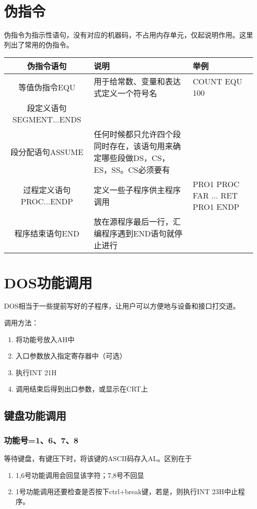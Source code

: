 \section{伪指令}
伪指令为指示性语句，没有对应的机器码，不占用内存单元，仅起说明作用。这里列出了常用的伪指令。
\begin{table}[H]
    \begin{tabularx}{\textwidth}{|c|X|X|}%
        \hline
        伪指令语句 & 说明 & 举例\\ \hline
        等值伪指令EQU & 用于给常数、变量和表达式定义一个符号名 & COUNT EQU 100\\ \hline
        段定义语句SEGMENT...ENDS& ~ & ~\\ \hline
        段分配语句ASSUME& 任何时候都只允许四个段同时存在，该语句用来确定哪些段做DS，CS，ES，SS。CS必须要有& ~\\ \hline
        过程定义语句PROC...ENDP&定义一些子程序供主程序调用& PRO1 PROC FAR ... RET PRO1 ENDP\\ \hline
        程序结束语句END&放在源程序最后一行，汇编程序遇到END语句就停止进行& \\ \hline
    \end{tabularx}
\end{table}
\section{DOS功能调用}
DOS相当于一些提前写好的子程序，让用户可以方便地与设备和接口打交道。

调用方法：
\begin{enumerate}
    \item 将功能号放入AH中
    \item 入口参数放入指定寄存器中（可选）
    \item 执行INT 21H
    \item 调用结束后得到出口参数，或显示在CRT上
\end{enumerate}
\subsection{键盘功能调用}
\subsubsection{功能号=1、6、7、8}
等待键盘，有键压下时，将该键的ASCII码存入AL。区别在于
\begin{enumerate}
    \item 1,6号功能调用会回显该字符；7,8号不回显
    \item 1号功能调用还要检查是否按下ctrl+break键，若是，则执行INT 23H中止程序。
\end{enumerate}
